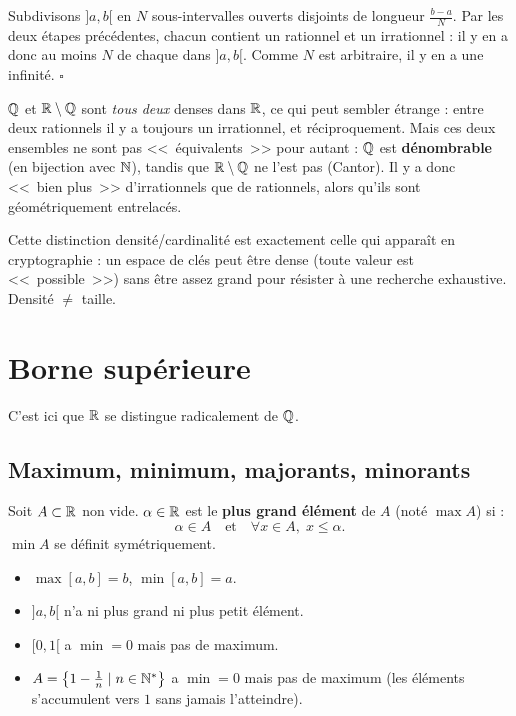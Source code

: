 \begin{proofbox}
Subdivisons $]a, b[$ en $N$ sous-intervalles ouverts disjoints de longueur $\frac{b-a}{N}$. Par les deux étapes précédentes, chacun contient un rationnel et un irrationnel : il y en a donc au moins $N$ de chaque dans $]a, b[$. Comme $N$ est arbitraire, il y en a une infinité. \hfill$\square$
\end{proofbox}

\begin{intuitionbox}
$\mathbb{Q}$ et $\mathbb{R} \setminus \mathbb{Q}$ sont \emph{tous deux} denses dans $\mathbb{R}$, ce qui peut sembler étrange : entre deux rationnels il y a toujours un irrationnel, et réciproquement. Mais ces deux ensembles ne sont pas <<~équivalents~>> pour autant : $\mathbb{Q}$ est \textbf{dénombrable} (en bijection avec $\mathbb{N}$), tandis que $\mathbb{R} \setminus \mathbb{Q}$ ne l'est pas (Cantor). Il y a donc <<~bien plus~>> d'irrationnels que de rationnels, alors qu'ils sont géométriquement entrelacés.

Cette distinction densité/cardinalité est exactement celle qui apparaît en cryptographie : un espace de clés peut être dense (toute valeur est <<~possible~>>) sans être assez grand pour résister à une recherche exhaustive. Densité $\neq$ taille.
\end{intuitionbox}


\section{Borne supérieure}

C'est ici que $\mathbb{R}$ se distingue radicalement de $\mathbb{Q}$.

\subsection{Maximum, minimum, majorants, minorants}

\begin{defbox}
Soit $A \subset \mathbb{R}$ non vide. $\alpha \in \mathbb{R}$ est le \textbf{plus grand élément} de $A$ (noté $\max A$) si :
\[
  \alpha \in A \quad \text{et} \quad \forall x \in A,\; x \leqslant \alpha.
\]
$\min A$ se définit symétriquement.
\end{defbox}

\begin{exbox}
\begin{itemize}[leftmargin=1cm]
  \item $\max [a, b] = b$, $\min [a, b] = a$.
  \item $]a, b[$ n'a ni plus grand ni plus petit élément.
  \item $[0, 1[$ a $\min = 0$ mais pas de maximum.
  \item $A = \left\{1 - \frac{1}{n} \mid n \in \mathbb{N}^* \right\}$ a $\min = 0$ mais pas de maximum (les éléments s'accumulent vers $1$ sans jamais l'atteindre).
\end{itemize}
\end{exbox}

